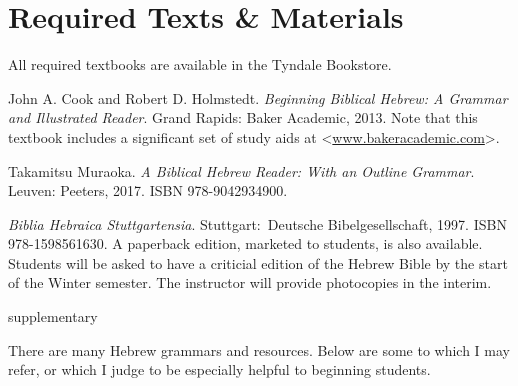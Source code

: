 \documentclass[titlepage]{article}
\newcommand\incl{../includes}
\begin{document}


\section{Required Texts \& Materials}
\label{texts}

All required textbooks are available in the Tyndale Bookstore.

\begingroup
\renewcommand{\section}[2]{}%
\begin{thebibliography}{BBH}%

    John A. Cook and Robert D. Holmstedt.
    \emph{Beginning Biblical Hebrew: A Grammar and Illustrated Reader}.
    Grand Rapids: Baker Academic, 2013. Note that this textbook includes a significant set of study aids at
    <\href{http://www.bakerpublishinggroup.com/books/beginning-biblical-hebrew/342630/students/esources}{www.bakeracademic.com}>.

    Takamitsu Muraoka.
    \emph{A Biblical Hebrew Reader: With an Outline Grammar}.
    Leuven: Peeters, 2017. ISBN 978-9042934900.

    \emph{Biblia Hebraica Stuttgartensia}.
    Stuttgart: Deutsche Bibel\-ge\-sell\-schaft, 1997. ISBN 978-1598561630.
    A paperback edition, marketed to students, is also available.
    Students will be asked to have a criticial edition of the Hebrew
    Bible by the start of the Winter semester. The instructor will
    provide photocopies in the interim.

\end{thebibliography}
\endgroup

\section{Supplementary Texts}
\label{supplementary}

There are many Hebrew grammars and resources. Below are some to which
I may refer, or which I judge to be especially helpful to beginning
students.
\end{document}
